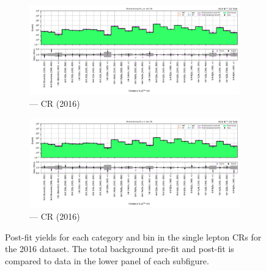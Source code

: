 \begin{figure}[htbp]
    \centering
    \begin{subfigure}[b]{0.9\textwidth}
        \includegraphics[width=\textwidth]{chapters/higgstoinv/figures/mountain_ranges/2016/ttH/Wmunu_tree_fit_b-abs_values_ttH_cats.pdf}
        \caption{\ttH --- \singleMuCr \gls{CR} (2016)}
    \end{subfigure}

    \begin{subfigure}[b]{0.9\textwidth}
        \includegraphics[width=\textwidth]{chapters/higgstoinv/figures/mountain_ranges/2016/ttH/Wenu_tree_fit_b-abs_values_ttH_cats.pdf}
        \caption{\ttH --- \singleEleCr \gls{CR} (2016)}
    \end{subfigure}
    \caption[Post-fit yields for each \ttH category and \ptmiss bin in the single lepton control regions for the 2016 dataset]{Post-fit yields for each \ttH category and \ptmiss bin in the single lepton \glspl{CR} for the 2016 dataset. The total background pre-fit and post-fit is compared to data in the lower panel of each subfigure.}
    \label{fig:htoinv_mountain_range_ttH_2016_single_lep_CRs}
\end{figure}

